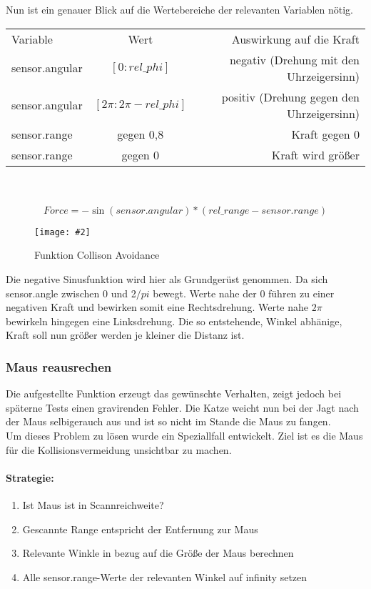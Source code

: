 \documentclass[
a4paper,     %
12pt         %
]{scrartcl}  %
\newcommand{\mygraphics}[3]{
\begin{figure}[!h]
  \begin{center}
    \texttt{[image: \#2]} \\
    \caption{#3}\label{fig:#2}
  \end{center}
\end{figure}

}
\begin{document}
Nun ist ein genauer Blick auf die Wertebereiche der relevanten Variablen nötig.\\

 \begin{tabular}[h]{lcr}
 Variable & Wert & Auswirkung auf die Kraft \\
 sensor.angular & $[0 : rel\_phi]$ & negativ (Drehung mit den Uhrzeigersinn) \\
 sensor.angular & $[2\pi : 2\pi-rel\_phi]$ & positiv (Drehung gegen den Uhrzeigersinn) \\
 sensor.range & gegen 0,8  & Kraft gegen 0 \\
 sensor.range & gegen 0 & Kraft wird größer \\

 \end{tabular}
\\
\\

\[ Force= -\sin(sensor.angular) * (rel\_range-sensor.range) \]
\mygraphics{0.7\textwidth}{Kollision.png}{Funktion Collison Avoidance}
Die negative Sinusfunktion wird hier als Grundgerüst genommen. Da sich sensor.angle zwischen 0 und 2$/pi$ bewegt. Werte nahe der 0 führen zu einer negativen Kraft und bewirken somit eine Rechtsdrehung. Werte nahe $2\pi $ bewirkeln hingegen eine Linksdrehung. Die so entstehende, Winkel abhänige, Kraft soll nun größer werden je kleiner die Distanz ist.


\subsubsection{Maus reausrechen}
Die aufgestellte Funktion erzeugt das gewünschte Verhalten, zeigt jedoch bei späterne Tests einen gravirenden Fehler. Die Katze weicht nun bei der Jagt nach der Maus selbigerauch aus und ist so nicht im Stande die Maus zu fangen. \\
Um dieses Problem zu lösen wurde ein Speziallfall entwickelt.
Ziel ist es die Maus für die Kollisionsvermeidung unsichtbar zu machen. \\
\paragraph{Strategie:}
\begin{enumerate}
\item Ist Maus ist in Scannreichweite?
\item Gescannte Range entspricht der Entfernung zur Maus
\item Relevante Winkle in bezug auf die Größe der Maus berechnen
\item Alle sensor.range-Werte der relevanten Winkel auf infinity setzen
\end{enumerate}
\end{document}
